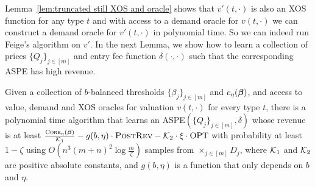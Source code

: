  	Lemma~\ref{lem:truncated still XOS and oracle} shows that $v'(t,\cdot)$ is also an XOS function for any type $t$ and with access to a demand oracle for $v(t,\cdot)$  we can construct a demand oracle for $v'(t,\cdot)$ in polynomial time.
 	 So we can indeed run Feige's algorithm on $v'$. In the next Lemma, we show how to learn a collection of prices $\{Q_j\}_{j\in[m]}$ and entry fee function $\delta(\cdot,\cdot)$ such that the corresponding ASPE has high revenue.
 	
\begin{lemma}\label{lem:symmetric XOS learning prices}
Given a collection of $b$-balanced thresholds $\{\beta_j\}_{j\in[m]}$ and $c_\eta(\boldsymbol{\beta})$, and access to value, demand and XOS oracles for valuation $v(t,\cdot)$ for every type $t$, there is a polynomial time algorithm that learns an ASPE$(\{Q_j\}_{j\in[m]},\delta)$ whose revenue is at least  $\frac{\textsc{Core}_{\eta}(\boldsymbol{\beta})}{{\mathcal{K}}_1}-g(b,\eta)\cdot \textsc{PostRev}-{\mathcal{K}}_2\cdot \xi\cdot \text{OPT}$ with probability at least $1-\zeta$ using $O\left(n^3(m+n)^2\log \frac{m}{\zeta}\right)$ samples from $\times_{j\in[m]} D_j$, where ${\mathcal{K}}_1$ and ${\mathcal{K}}_2$ are positive absolute constants, and $g(b,\eta)$ is a function that only depends on $b$ and $\eta$.
\end{lemma}
